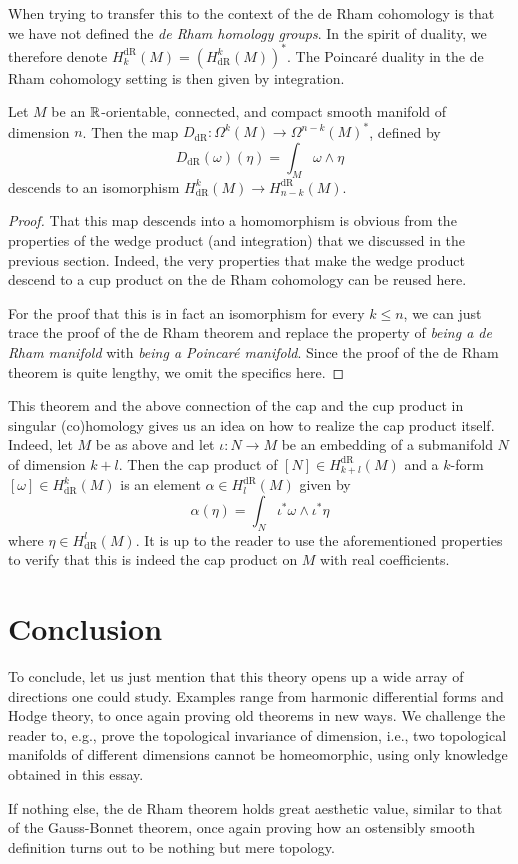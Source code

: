 \documentclass[a4paper, 12pt]{article}
\begin{document}
When trying to transfer this to the context of the de Rham cohomology is that we have not defined the \emph{de Rham homology groups}.
In the spirit of duality, we therefore denote $H_k^{\text{dR}}(M) = \left( H_{\text{dR}}^k(M) \right)^*$.
The Poincar\'e duality in the de Rham cohomology setting is then given by integration.
\begin{theorem}
    Let $M$ be an $\mathbb{R}$-orientable, connected, and compact smooth manifold of dimension $n$.
    Then the map $D_{\text{dR}} \colon \Omega^k(M) \to \Omega^{n-k}(M)^*$, defined by
    \[
        D_{\text{dR}}(\omega)(\eta) = \int_{M} \omega \wedge \eta
    \]
    descends to an isomorphism $H_{\text{dR}}^k(M) \to H_{n-k}^{\text{dR}}(M)$.
\end{theorem}
\begin{proof}
    That this map descends into a homomorphism is obvious from the properties
    of the wedge product (and integration) that we discussed in the previous
    section.  Indeed, the very properties that make the wedge product descend
    to a cup product on the de Rham cohomology can be reused here.
    
    For the proof that this is in fact an isomorphism for every $k \leq n$, we
    can just trace the proof of the de Rham theorem and replace the property of
    \emph{being a de Rham manifold} with \emph{being a Poincar\'e manifold}.
    Since the proof of the de Rham theorem is quite lengthy, we omit the specifics here.
\end{proof}
This theorem and the above connection of the cap and the cup product in singular (co)homology gives us an idea on how to realize the cap product itself.
Indeed, let $M$ be as above and let $\iota \colon N \to M$ be an embedding of a submanifold $N$ of dimension $k+l$.
Then the cap product of $[N] \in H_{k+l}^{\text{dR}}(M)$ and a $k$-form $[\omega] \in H_{\text{dR}}^k(M)$ is an element $\alpha \in H_{l}^{\text{dR}}(M)$ given by
\[
    \alpha(\eta) = \int_{N} \iota^*\omega \wedge \iota^*\eta
\]
where $\eta \in H_{\text{dR}}^l(M)$.
It is up to the reader to use the aforementioned properties to verify that this is indeed the cap product on $M$ with real coefficients.

\section{Conclusion}

To conclude, let us just mention that this theory opens up a wide array of directions one could study.
Examples range from harmonic differential forms and Hodge theory, to once again proving old theorems in new ways.
We challenge the reader to, e.g., prove the topological invariance of dimension, i.e., two topological manifolds of different dimensions cannot be homeomorphic, using only knowledge obtained in this essay.

If nothing else, the de Rham theorem holds great aesthetic value, similar to that of the Gauss-Bonnet theorem, once again proving how an ostensibly smooth definition turns out to be nothing but mere topology.



\end{document}
